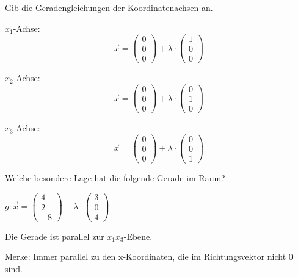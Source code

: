 \documentclass[paper=a6,landscape,ngerman,twoside=true,fontsize=12pt]{scrartcl}
\begin{document}
\begin{frage}
	\LARGE
	Gib die Geradengleichungen der Koordinatenachsen an.
\end{frage}
\begin{antwort}
	\large
	$x_1$-Achse:
	\[\vec{x}=\left(\begin{array}{c} 0 \\ 0 \\ 0\end{array} \right)+\lambda \cdot \left(\begin{array}{c} 1 \\ 0 \\ 0\end{array} \right)\]
	
	$x_2$-Achse:
	\[\vec{x}=\left(\begin{array}{c} 0 \\ 0 \\ 0\end{array} \right)+\lambda \cdot \left(\begin{array}{c} 0 \\ 1 \\ 0\end{array} \right)\]
	
	$x_3$-Achse:
	\[\vec{x}=\left(\begin{array}{c} 0 \\ 0 \\ 0\end{array} \right)+\lambda \cdot \left(\begin{array}{c} 0 \\ 0 \\ 1\end{array} \right)\]
	
\end{antwort}	
\begin{frage}
	\LARGE
	Welche besondere Lage hat die folgende Gerade im Raum?
	
	$g:\vec{x}=\left(\begin{array}{c} 4 \\ 2 \\ -8\end{array} \right)+\lambda \cdot \left(\begin{array}{c} 3 \\ 0 \\ 4\end{array} \right)$
\end{frage}
\begin{antwort}
	\Large
	Die Gerade ist parallel zur $x_1x_3$-Ebene.
	
	Merke: Immer parallel zu den x-Koordinaten, die im Richtungsvektor nicht 0 sind.
	
\end{antwort}	
\end{document}
